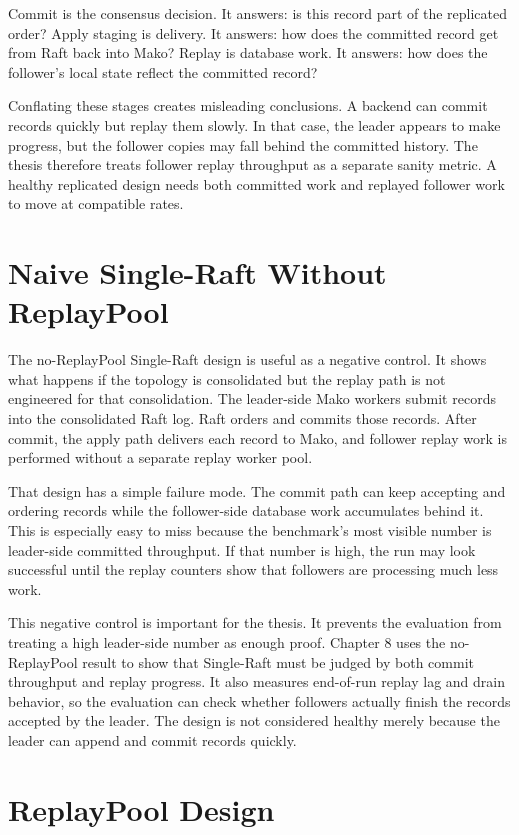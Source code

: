 Commit is the consensus decision. It answers: is this record part of the
replicated order? Apply staging is delivery. It answers: how does the committed
record get from Raft back into Mako? Replay is database work. It answers: how
does the follower's local state reflect the committed record?

Conflating these stages creates misleading conclusions. A backend can commit
records quickly but replay them slowly. In that case, the leader appears to
make progress, but the follower copies may fall behind the committed history.
The thesis therefore treats follower replay throughput as a separate sanity
metric. A healthy replicated design needs both committed work and replayed
follower work to move at compatible rates.

\section{Naive Single-Raft Without ReplayPool}

The no-ReplayPool Single-Raft design is useful as a negative control. It shows
what happens if the topology is consolidated but the replay path is not
engineered for that consolidation. The leader-side Mako workers submit records
into the consolidated Raft log. Raft orders and commits those records. After
commit, the apply path delivers each record to Mako, and follower replay work
is performed without a separate replay worker pool.

That design has a simple failure mode. The commit path can keep accepting and
ordering records while the follower-side database work accumulates behind it.
This is especially easy to miss because the benchmark's most visible number is
leader-side committed throughput. If that number is high, the run may look
successful until the replay counters show that followers are processing much
less work.

This negative control is important for the thesis. It prevents the evaluation
from treating a high leader-side number as enough proof. Chapter 8 uses the
no-ReplayPool result to show that Single-Raft must be judged by both commit
throughput and replay progress. It also measures end-of-run replay lag and
drain behavior, so the evaluation can check whether followers actually finish
the records accepted by the leader. The design is not considered healthy
merely because the leader can append and commit records quickly.

\section{ReplayPool Design}

